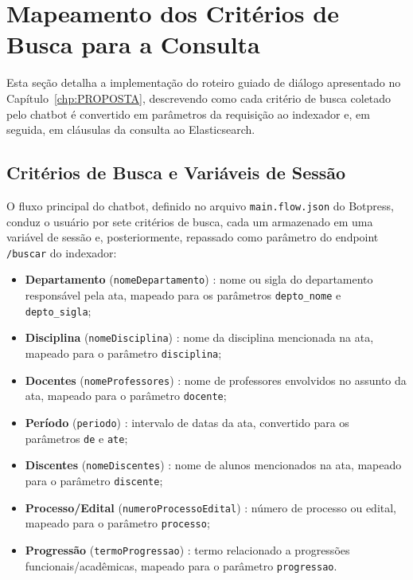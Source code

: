 \section{Mapeamento dos Critérios de Busca para a Consulta}\label{sec:mapeamento-criterios}

Esta seção detalha a implementação do roteiro guiado de diálogo apresentado no Capítulo~\ref{chp:PROPOSTA}, descrevendo como cada critério de busca coletado pelo chatbot é convertido em parâmetros da requisição ao indexador e, em seguida, em cláusulas da consulta ao Elasticsearch.

\subsection{Critérios de Busca e Variáveis de Sessão}

O fluxo principal do chatbot, definido no arquivo \texttt{main.flow.json} do Botpress, conduz o usuário por sete critérios de busca, cada um armazenado em uma variável de sessão e, posteriormente, repassado como parâmetro do endpoint \texttt{/buscar} do indexador:

\begin{itemize}
  \item \textbf{Departamento} (\texttt{nomeDepartamento}) : nome ou sigla do departamento responsável pela ata, mapeado para os parâmetros \texttt{depto\_nome} e \texttt{depto\_sigla};
  \item \textbf{Disciplina} (\texttt{nomeDisciplina}) : nome da disciplina mencionada na ata, mapeado para o parâmetro \texttt{disciplina};
  \item \textbf{Docentes} (\texttt{nomeProfessores}) : nome de professores envolvidos no assunto da ata, mapeado para o parâmetro \texttt{docente};
  \item \textbf{Período} (\texttt{periodo}) : intervalo de datas da ata, convertido para os parâmetros \texttt{de} e \texttt{ate};
  \item \textbf{Discentes} (\texttt{nomeDiscentes}) : nome de alunos mencionados na ata, mapeado para o parâmetro \texttt{discente};
  \item \textbf{Processo/Edital} (\texttt{numeroProcessoEdital}) : número de processo ou edital, mapeado para o parâmetro \texttt{processo};
  \item \textbf{Progressão} (\texttt{termoProgressao}) : termo relacionado a progressões funcionais/acadêmicas, mapeado para o parâmetro \texttt{progressao}.
\end{itemize}

